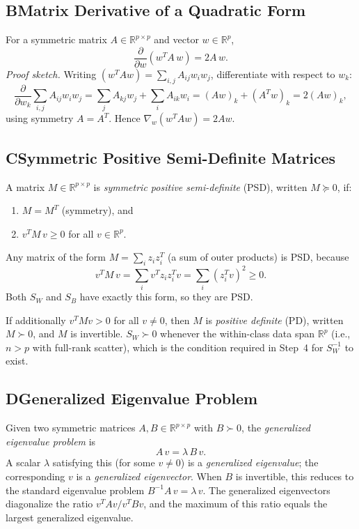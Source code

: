 \documentclass[11pt]{article}
\begin{document}
\subsection*{B\quad Matrix Derivative of a Quadratic Form}
\label{app:matderiv}

For a symmetric matrix $A \in \mathbb{R}^{p\times p}$ and vector $w \in \mathbb{R}^p$,
\[
  \frac{\partial}{\partial w}(w^T A\, w) = 2A\, w.
\]
\textit{Proof sketch.} Writing $(w^T A w) = \sum_{i,j} A_{ij} w_i w_j$, differentiate with respect to $w_k$:
\[
  \frac{\partial}{\partial w_k}\sum_{i,j} A_{ij} w_i w_j
  = \sum_j A_{kj} w_j + \sum_i A_{ik} w_i = (Aw)_k + (A^T w)_k = 2(Aw)_k,
\]
using symmetry $A = A^T$. Hence $\nabla_w (w^TAw) = 2Aw$.

\subsection*{C\quad Symmetric Positive Semi-Definite Matrices}
\label{app:psd}

A matrix $M \in \mathbb{R}^{p\times p}$ is \emph{symmetric positive semi-definite} (PSD), written $M \succeq 0$, if:
\begin{enumerate}
  \item $M = M^T$ (symmetry), and
  \item $v^T M\, v \geq 0$ for all $v \in \mathbb{R}^p$.
\end{enumerate}

Any matrix of the form $M = \sum_i z_i z_i^T$ (a sum of outer products) is PSD, because
\[
  v^T M\, v = \sum_i v^T z_i z_i^T v = \sum_i (z_i^T v)^2 \geq 0.
\]
Both $S_W$ and $S_B$ have exactly this form, so they are PSD.

If additionally $v^T M v > 0$ for all $v \neq 0$, then $M$ is \emph{positive definite} (PD), written $M \succ 0$, and $M$ is invertible.
$S_W \succ 0$ whenever the within-class data span $\mathbb{R}^p$ (i.e., $n > p$ with full-rank scatter), which is the condition required in Step~4 for $S_W^{-1}$ to exist.

\subsection*{D\quad Generalized Eigenvalue Problem}
\label{app:geneig}

Given two symmetric matrices $A, B \in \mathbb{R}^{p\times p}$ with $B \succ 0$, the \emph{generalized eigenvalue problem} is
\[
  A\, v = \lambda\, B\, v.
\]
A scalar $\lambda$ satisfying this (for some $v \neq 0$) is a \emph{generalized eigenvalue}; the corresponding $v$ is a \emph{generalized eigenvector}.
When $B$ is invertible, this reduces to the standard eigenvalue problem $B^{-1}A\, v = \lambda\, v$.
The generalized eigenvectors diagonalize the ratio $v^T A v / v^T B v$, and the maximum of this ratio equals the largest generalized eigenvalue.
\end{document}
